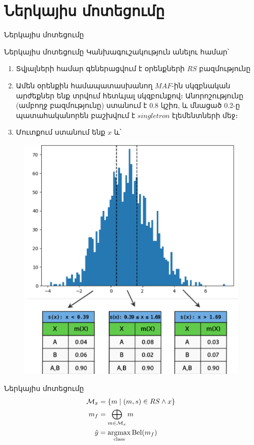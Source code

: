 \documentclass[aspectratio=169]{beamer}
\begin{document}
\section{Ներկայիս մոտեցումը}

\begin{frame}
    \begin{center}
        \Huge Ներկայիս մոտեցումը
    \end{center}
\end{frame}

\begin{frame}{Ներկայիս մոտեցումը}
    Կանխագուշակություն անելու համար՝
\begin{enumerate}
    \item Տվյալների համար գեներացվում է օրենքների $RS$ բազմությունը
    \item Ամեն օրենքին համապատասխանող $MAF$-ին սկզբնական արժեքներ ենք տրվում հետևյալ սկզբունքով։ Անորոշությունը (ամբողջ բազմությունը) ստանում է 0.8 կշիռ, և մնացած 0.2-ը պատահականորեն բաշխվում է $singletron$ էլեմենտների մեջ։
    \item Մուտքում ստանում ենք $x$ և՝
\end{enumerate}

\end{frame}

\begin{frame}
\begin{figure}
    \centering
    \includegraphics[width=0.45\linewidth]{../../fig/image.png}
    \label{fig:enter-label}
\end{figure}
    
\end{frame}



\begin{frame}{Ներկայիս մոտեցումը}
\begin{align*}
\mathcal{M}_x &= \left\{ m \mid (m, s) \in RS \land x \right\} \\
m_f &= \bigoplus_{m \in \mathcal{M}_x} m \\
\hat{y} &= \underset{{\rm class}}{\mathrm{argmax}} \, {\rm Bel}(m_f)
\end{align*}

\end{frame}
\end{document}
